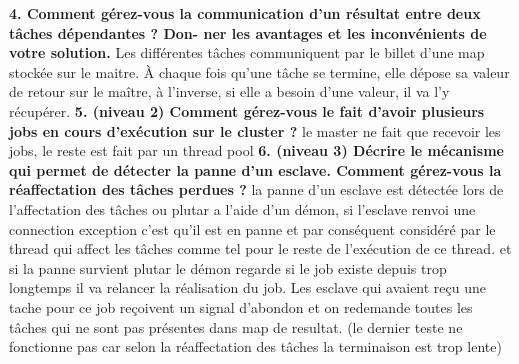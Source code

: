 \documentclass{article}
\begin{document}
\textbf{4. Comment gérez-vous la communication d’un résultat entre deux tâches dépendantes ? Don-
ner les avantages et les inconvénients de votre solution.}
\newline
\newline
Les différentes tâches communiquent par le billet d'une map stockée sur le maitre. 
À chaque fois qu'une tâche se termine, elle dépose sa valeur de retour sur le maître, à l'inverse, si elle a besoin d'une valeur, il va l'y récupérer. 
\newline
\newline
\textbf{5. (niveau 2) Comment gérez-vous le fait d’avoir plusieurs jobs en cours d’exécution sur le
cluster ?}
\newline
\newline
le master ne fait que recevoir les jobs, le reste est fait par un thread pool
\newline
\newline
\textbf{6. (niveau 3) Décrire le mécanisme qui permet de détecter la panne d’un esclave. Comment
gérez-vous la réaffectation des tâches perdues ?}
\newline
\newline
la panne d'un esclave est détectée lors de l'affectation des tâches ou plutar a l'aide d'un démon, si l'esclave renvoi une connection exception c'est qu'il est en panne 
et par conséquent considéré par le thread qui affect les tâches comme tel pour le reste de l'exécution de ce thread.
et si la panne survient plutar le démon regarde si le job existe depuis trop longtemps il va relancer la réalisation du job.
Les esclave qui avaient reçu une tache pour ce job reçoivent un signal d'abondon et on redemande toutes les tâches qui ne sont pas présentes dans map de resultat.
\newline
(le dernier teste ne fonctionne pas car selon la réaffectation des tâches la terminaison est trop lente)
\end{document}
